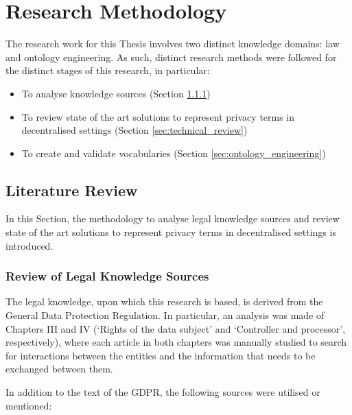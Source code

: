 \section{Research Methodology}
\label{sec:methodology}

The research work for this Thesis involves two distinct knowledge domains: law and ontology engineering. As such, distinct research methods were followed for the distinct stages of this research, in particular:

\begin{itemize}
    \item To analyse knowledge sources (Section \ref{sec:law_review})
    \item To review state of the art solutions to represent privacy terms in decentralised settings (Section \ref{sec:technical_review})
    \item To create and validate vocabularies (Section \ref{sec:ontology_engineering})
\end{itemize}

\subsection{Literature Review}
\label{sec:literature_review}

In this Section, the methodology to analyse legal knowledge sources and review state of the art solutions to represent privacy terms in decentralised settings is introduced.

\subsubsection{Review of Legal Knowledge Sources}
\label{sec:law_review}

The legal knowledge, upon which this research is based, is derived from the General Data Protection Regulation.
In particular, an analysis was made of Chapters III and IV (`Rights of the data subject' and `Controller and processor', respectively), where each article in both chapters was manually studied to search for interactions between the entities and the information that needs to be exchanged between them.

In addition to the text of the GDPR, the following sources were utilised or mentioned:

